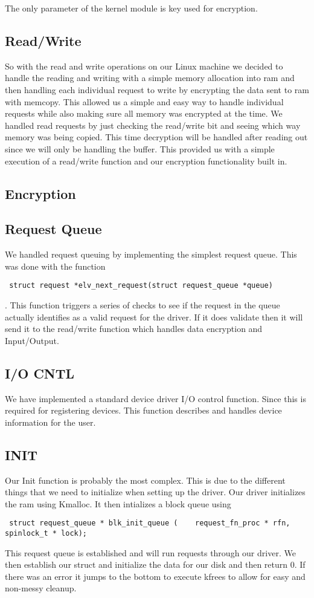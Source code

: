 \documentclass[onecolumn, draftclsnofoot,10pt, compsoc]{IEEEtran}
\begin{document}
    The only parameter of the kernel module is key used for encryption.
        
	\subsection{Read/Write}
    So with the read and write operations on our Linux machine we decided to handle the reading and writing with a simple memory allocation into ram and then handling each individual request to write by encrypting the data sent to ram with memcopy. This allowed us a simple and easy way to handle individual requests while also making sure all memory was encrypted at the time. We handled read requests by just checking the read/write bit and seeing which way memory was being copied. This time decryption will be handled after reading out since we will only be handling the buffer. This provided us with a simple execution of a read/write function and our encryption functionality built in.
    \subsection{Encryption}
    
    \subsection{Request Queue}
    We handled request queuing by implementing the simplest request queue. This was done with the function \begin{verbatim} struct request *elv_next_request(struct request_queue *queue) \end{verbatim}. This function triggers a series of checks to see if the request in the queue actually identifies as a valid request for the driver. If it does validate then it will send it to the read/write function which handles data encryption and Input/Output.
	\subsection{I/O CNTL}
	We have implemented a standard device driver I/O control function. Since this is required for registering devices. This function describes and handles device information for the user.
    
	\subsection{INIT}
    Our Init function is probably the most complex. This is due to the different things that we need to initialize when setting up the driver. Our driver initializes the ram using Kmalloc. It then intializes a block queue using \begin{verbatim} struct request_queue * blk_init_queue (	request_fn_proc * rfn, spinlock_t * lock); \end{verbatim} This request queue is established and will run requests through our driver. We then establish our struct and initialize the data for our disk and then return 0. If there was an error it jumps to the bottom to execute kfrees to allow for easy and non-messy cleanup.
    
\end{document}
